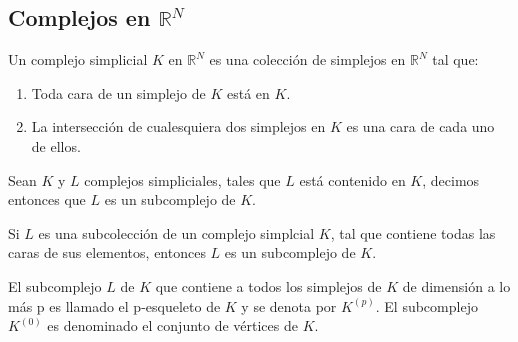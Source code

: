 \subsection{Complejos en $\mathbb{R}^N$}
\begin{Defi}
Un complejo simplicial $\textit{K}$ en $\mathbb{R}^N$  es una colección de simplejos en $\mathbb{R}^N$ tal que:
\begin{enumerate}
\item Toda cara de un simplejo de $\textit{K}$ está en $\textit{K}$.
\item La intersección de cualesquiera dos simplejos en $\textit{K}$ es una cara de cada uno de ellos.
\end{enumerate} 
\end{Defi}
\begin{Defi}
Sean $\textit{K}$ y $\textit{L}$ complejos simpliciales, tales que $\textit{L}$ está contenido en $\textit{K}$, decimos entonces que $\textit{L}$ es un subcomplejo de $\textit{K}$. 
\end{Defi}

\begin{Prop}
Si $\textit{L}$ es una subcolección de un complejo simplcial $\textit{K}$, tal que contiene todas las caras de sus elementos, entonces $\textit{L}$ es un subcomplejo de $\textit{K}$.
\end{Prop}

\begin{Defi}
El subcomplejo $\textit{L}$ de $\textit{K}$ que contiene a todos los simplejos de $\textit{K}$ de dimensión a lo más p es llamado el p-esqueleto de $\textit{K}$ y se denota por $\textit{K}^{(p)}$. 
El subcomplejo $\textit{K}^{(0)}$ es denominado el conjunto de vértices de $\textit{K}$.
\end{Defi}

